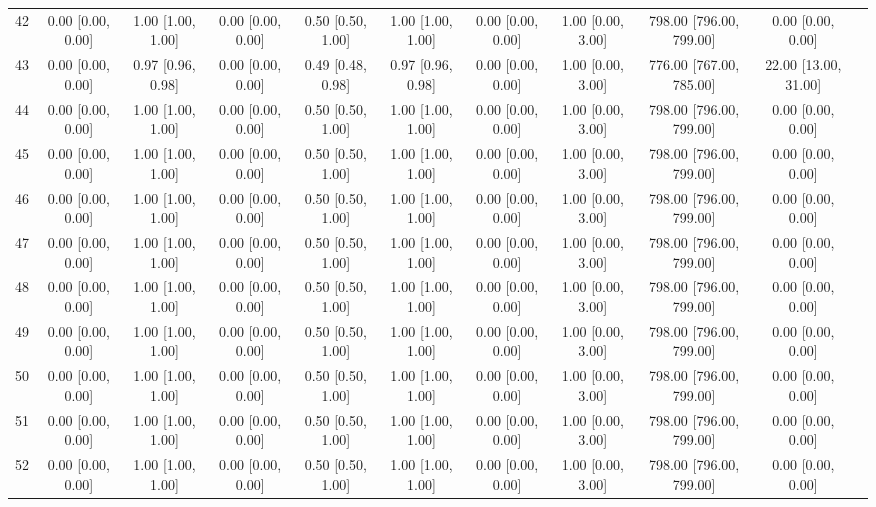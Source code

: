 \documentclass[8pt]{article}
\begin{document}
\begin{center}
\begin{footnotesize}
\begin{longtable}{|ccccccccccc|}
 42 &  0.00 [0.00, 0.00] &  1.00 [1.00, 1.00] &  0.00 [0.00, 0.00] &  0.50 [0.50, 1.00] &  1.00 [1.00, 1.00] &  0.00 [0.00, 0.00] &  1.00 [0.00, 3.00] &  798.00 [796.00, 799.00] &       0.00 [0.00, 0.00] \\
 43 &  0.00 [0.00, 0.00] &  0.97 [0.96, 0.98] &  0.00 [0.00, 0.00] &  0.49 [0.48, 0.98] &  0.97 [0.96, 0.98] &  0.00 [0.00, 0.00] &  1.00 [0.00, 3.00] &  776.00 [767.00, 785.00] &    22.00 [13.00, 31.00] \\
 44 &  0.00 [0.00, 0.00] &  1.00 [1.00, 1.00] &  0.00 [0.00, 0.00] &  0.50 [0.50, 1.00] &  1.00 [1.00, 1.00] &  0.00 [0.00, 0.00] &  1.00 [0.00, 3.00] &  798.00 [796.00, 799.00] &       0.00 [0.00, 0.00] \\
 45 &  0.00 [0.00, 0.00] &  1.00 [1.00, 1.00] &  0.00 [0.00, 0.00] &  0.50 [0.50, 1.00] &  1.00 [1.00, 1.00] &  0.00 [0.00, 0.00] &  1.00 [0.00, 3.00] &  798.00 [796.00, 799.00] &       0.00 [0.00, 0.00] \\
 46 &  0.00 [0.00, 0.00] &  1.00 [1.00, 1.00] &  0.00 [0.00, 0.00] &  0.50 [0.50, 1.00] &  1.00 [1.00, 1.00] &  0.00 [0.00, 0.00] &  1.00 [0.00, 3.00] &  798.00 [796.00, 799.00] &       0.00 [0.00, 0.00] \\
 47 &  0.00 [0.00, 0.00] &  1.00 [1.00, 1.00] &  0.00 [0.00, 0.00] &  0.50 [0.50, 1.00] &  1.00 [1.00, 1.00] &  0.00 [0.00, 0.00] &  1.00 [0.00, 3.00] &  798.00 [796.00, 799.00] &       0.00 [0.00, 0.00] \\
 48 &  0.00 [0.00, 0.00] &  1.00 [1.00, 1.00] &  0.00 [0.00, 0.00] &  0.50 [0.50, 1.00] &  1.00 [1.00, 1.00] &  0.00 [0.00, 0.00] &  1.00 [0.00, 3.00] &  798.00 [796.00, 799.00] &       0.00 [0.00, 0.00] \\
 49 &  0.00 [0.00, 0.00] &  1.00 [1.00, 1.00] &  0.00 [0.00, 0.00] &  0.50 [0.50, 1.00] &  1.00 [1.00, 1.00] &  0.00 [0.00, 0.00] &  1.00 [0.00, 3.00] &  798.00 [796.00, 799.00] &       0.00 [0.00, 0.00] \\
 50 &  0.00 [0.00, 0.00] &  1.00 [1.00, 1.00] &  0.00 [0.00, 0.00] &  0.50 [0.50, 1.00] &  1.00 [1.00, 1.00] &  0.00 [0.00, 0.00] &  1.00 [0.00, 3.00] &  798.00 [796.00, 799.00] &       0.00 [0.00, 0.00] \\
 51 &  0.00 [0.00, 0.00] &  1.00 [1.00, 1.00] &  0.00 [0.00, 0.00] &  0.50 [0.50, 1.00] &  1.00 [1.00, 1.00] &  0.00 [0.00, 0.00] &  1.00 [0.00, 3.00] &  798.00 [796.00, 799.00] &       0.00 [0.00, 0.00] \\
 52 &  0.00 [0.00, 0.00] &  1.00 [1.00, 1.00] &  0.00 [0.00, 0.00] &  0.50 [0.50, 1.00] &  1.00 [1.00, 1.00] &  0.00 [0.00, 0.00] &  1.00 [0.00, 3.00] &  798.00 [796.00, 799.00] &       0.00 [0.00, 0.00] \\

\end{longtable}
\end{footnotesize}
\end{center}
\end{document}
